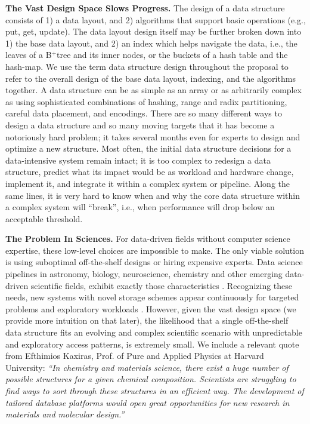 \documentclass[11pt]{article}
\begin{document}
\textbf{The Vast Design Space Slows Progress.}
The design of a data structure consists of 1) a data layout, and 2) algorithms that support basic operations (e.g., put, get, update). The data layout design itself may be further broken down into 1) the base data layout, and 2) an index  which helps navigate the data, i.e., the leaves of a B$^{+}$tree and its inner nodes, or the buckets of a hash table and the hash-map. We use the term data structure design throughout the proposal to refer to the overall design of the base data layout, indexing, and the algorithms together. A data structure can be as simple as an array or as arbitrarily complex as using sophisticated combinations of hashing, range and radix partitioning, careful data placement, and encodings. There are so many different ways to design a data structure and so many moving targets that it has become a notoriously hard problem; it takes several months even for experts to design and optimize a new structure. Most often, the initial data structure decisions for a data-intensive system remain intact; it is too complex to redesign a data structure, predict what its impact would be as workload and hardware change, implement it, and integrate it within a complex system or pipeline. Along the same lines, it is very hard to know when and why the core data structure within a complex system will ``break'', i.e., when performance will drop below an acceptable threshold. 


\textbf{The Problem In Sciences.} For data-driven fields without computer science expertise, these low-level choices are impossible to make. The only viable solution is using suboptimal off-the-shelf designs or hiring expensive experts. Data science pipelines in astronomy, biology, neuroscience, chemistry and other emerging data-driven scientific fields, exhibit exactly those characteristics \cite{Stonebraker2012, Stonebraker2013}. Recognizing these needs, new systems with novel storage schemes appear continuously for targeted problems \cite{Fernandez2018, Papadopoulos2016, SciDB2016, Seering2012, Xing2018} and exploratory workloads \cite{Kersten2011,Wasay2015,Idreos2013,Idreos2015}. However, given the vast design space (we provide more intuition on that later), the likelihood that a single off-the-shelf data structure fits an evolving and complex scientific scenario with unpredictable and exploratory access patterns, is extremely small. We include a relevant quote from Efthimios Kaxiras, Prof. of Pure and Applied Physics at Harvard University: \textit{``In chemistry and materials science, there exist a huge number of possible structures for a given chemical composition. Scientists are struggling to find ways to sort through these structures in an efficient way. The development of tailored database platforms would open great opportunities for new research in materials and molecular design.''}
\end{document}
